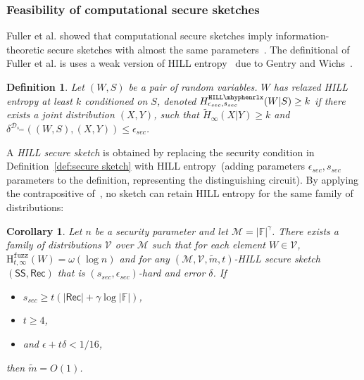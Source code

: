 \documentclass[11pt]{article}
\newcommand{\defref}[1]{\mbox{Definition~\ref{#1}}}
\newcommand{\class}[1]{{\ensuremath{\mathsf{#1}}}}
\newcommand{\sketch}{\ensuremath{\class{SS}}\xspace}
\newcommand{\rec}{\ensuremath{\class{Rec}}\xspace}
\newcommand{\hillrlx}{\ensuremath{\mathtt{HILL\mhyphen rlx}}\xspace}
\newcommand{\Hfuzz}{\mathrm{H}^{\mathtt{fuzz}}_{t,\infty}}
\newtheorem{corollary}[theorem]{Corollary}
\newtheorem{definition}[theorem]{Definition}
\begin{document}
\subsubsection{Feasibility of computational secure sketches}
Fuller et al. showed that computational secure sketches imply information-theoretic secure sketches with almost the same parameters~\cite[Corollary 3.8]{fuller2013computational}.  %
The definitional of Fuller et al. is uses a weak version of HILL entropy~\cite{DBLP:journals/siamcomp/HastadILL99} due to Gentry and Wichs~\cite{gentry2011separating}.

\begin{definition}
\label{def:relaxed hill}
Let $(W, S)$ be a pair of random variables.  $W$ has 
\emph{relaxed HILL entropy} at least $k$ conditioned on $S$,
denoted $H^{\hillrlx}_{\epsilon_{sec}, s_{sec}}(W|S)\geq k$ if there exists a joint distribution $(X, Y)$, such that $\tilde{H}_\infty(X|Y)\geq k$ and $\delta^{\mathcal{D}_{s_{sec}}} ((W, S),(X,Y))\leq \epsilon_{sec}$.
\end{definition}

A \emph{HILL secure sketch} is obtained by replacing the security condition in \defref{def:secure sketch} with HILL entropy~(adding parameters $\epsilon_{sec}, s_{sec}$ parameters to the definition, representing the distinguishing circuit).  By applying the contrapositive of~\cite[Corollary 3.8]{fuller2013computational}, no sketch can retain HILL entropy for the same family of distributions:

\begin{corollary}
\label{cor:imposs comp sketch}
Let $n$ be a security parameter and let $\mathcal{M} = |\mathbb{F}|^\gamma$.  There exists a family of distributions $\mathcal{V}$ over $\mathcal{M}$ such that for each element $W\in \mathcal{V}$, $\Hfuzz(W)= \omega(\log n)$ and for any $(\mathcal{M}, \mathcal{V}, \tilde{m}, t)$-HILL secure sketch $(\sketch, \rec)$ that is $(s_{sec}, \epsilon_{sec})$-hard and error $\delta$.  If 
\begin{itemize}
\item $s_{sec}\ge t(|\rec| + \gamma \log |\mathbb{F}|)$, 
\item $t\ge 4$,
\item and $\epsilon + t\delta < 1/16$,
\end{itemize}
 then $\tilde{m} =O(1)$.
\end{corollary}
\end{document}
